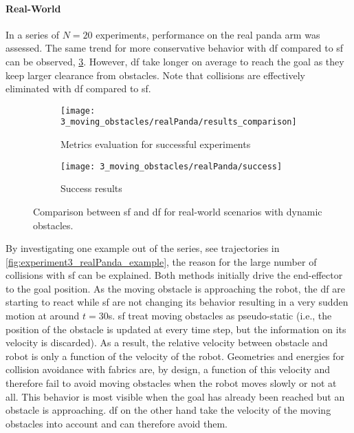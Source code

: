 \paragraph{Real-World}
In a series of $N=20$ experiments, performance on the real panda arm was assessed. The same
trend for more conservative behavior with \ac{df} compared to \ac{sf} can be observed,
\cref{fig:experiment3_realPanda}. However, \ac{df} take longer on average to reach the
goal as they keep larger clearance from obstacles. Note that collisions are effectively
eliminated with \ac{df} compared to \ac{sf}.

\begin{figure}[h]
  \centering
  \begin{subfigure}{1.0\linewidth}
    \centering
    \texttt{[image: 3\_moving\_obstacles/realPanda/results\_comparison]}
    \caption{Metrics evaluation for successful experiments}%
    \label{subfig:experiment3_realPanda_res}
  \end{subfigure}
  \begin{subfigure}{1.0\linewidth}
    \centering
    \texttt{[image: 3\_moving\_obstacles/realPanda/success]}
    \caption{Success results}%
    \label{subfig:experiment3_realPanda_success}
  \end{subfigure}
  \caption{Comparison between \ac{sf} and \ac{df} for real-world scenarios with dynamic obstacles.
  }%
  \label{fig:experiment3_realPanda}
\end{figure}


By investigating one example out of the series, see trajectories in
\cref{fig:experiment3_realPanda_example}, the reason for the large number of collisions
with \ac{sf} can be explained.
Both methods initially drive
the end-effector to the goal position. As the moving obstacle is approaching the robot,
the \ac{df} are starting to react while \ac{sf} are not changing its behavior resulting
in a very sudden motion at around $t=30$s.
\ac{sf} treat moving obstacles as pseudo-static (i.e., the position of the obstacle
is updated at every time step, but the information on its velocity is discarded).  As a
result, the relative velocity between obstacle and robot is only a function of the
velocity of the robot. Geometries and energies for collision avoidance with fabrics are,
by design, a function of this velocity and therefore fail to avoid moving obstacles when
the robot moves slowly or not at all. This behavior is most visible when the goal has
already been reached but an obstacle is approaching. \ac{df} on the other hand
take the velocity of the moving obstacles into account and can therefore avoid them.

